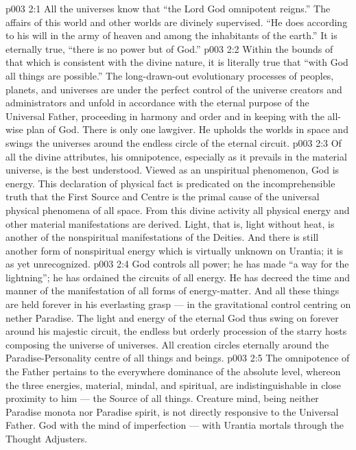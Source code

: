 \vs p003 2:1 All the universes know that “the Lord God omnipotent reigns.” The affairs of this world and other worlds are divinely supervised. “He does according to his will in the army of heaven and among the inhabitants of the earth.” It is eternally true, “there is no power but of God.”
\vs p003 2:2 Within the bounds of that which is consistent with the divine nature, it is literally true that “with God all things are possible.” The long\hyp{}drawn\hyp{}out evolutionary processes of peoples, planets, and universes are under the perfect control of the universe creators and administrators and unfold in accordance with the eternal purpose of the Universal Father, proceeding in harmony and order and in keeping with the all\hyp{}wise plan of God. There is only one lawgiver. He upholds the worlds in space and swings the universes around the endless circle of the eternal circuit.
\vs p003 2:3 Of all the divine attributes, his omnipotence, especially as it prevails in the material universe, is the best understood. Viewed as an unspiritual phenomenon, God is energy. This declaration of physical fact is predicated on the incomprehensible truth that the First Source and Centre is the primal cause of the universal physical phenomena of all space. From this divine activity all physical energy and other material manifestations are derived. Light, that is, light without heat, is another of the nonspiritual manifestations of the Deities. And there is still another form of nonspiritual energy which is virtually unknown on Urantia; it is as yet unrecognized.
\vs p003 2:4 God controls all power; he has made “a way for the lightning”; he has ordained the circuits of all energy. He has decreed the time and manner of the manifestation of all forms of energy\hyp{}matter. And all these things are held forever in his everlasting grasp --- in the gravitational control centring on nether Paradise. The light and energy of the eternal God thus swing on forever around his majestic circuit, the endless but orderly procession of the starry hosts composing the universe of universes. All creation circles eternally around the Paradise\hyp{}Personality centre of all things and beings.
\vs p003 2:5 The omnipotence of the Father pertains to the everywhere dominance of the absolute level, whereon the three energies, material, mindal, and spiritual, are indistinguishable in close proximity to him --- the Source of all things. Creature mind, being neither Paradise monota nor Paradise spirit, is not directly responsive to the Universal Father. God  with the mind of imperfection --- with Urantia mortals through the Thought Adjusters.
